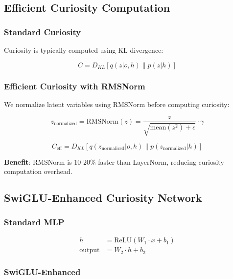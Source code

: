 \documentclass{IEEEtran}
\begin{document}
\subsection{Efficient Curiosity Computation}

\subsubsection{Standard Curiosity}

Curiosity is typically computed using KL divergence:

\begin{equation}
C = D_{KL}[q(z|o, h) \| p(z|h)]
\end{equation}

\subsubsection{Efficient Curiosity with RMSNorm}

We normalize latent variables using RMSNorm before computing curiosity:

\begin{equation}
z_{\text{normalized}} = \text{RMSNorm}(z) = \frac{z}{\sqrt{\text{mean}(z^2) + \epsilon}} \cdot \gamma
\end{equation}

\begin{equation}
C_{\text{eff}} = D_{KL}[q(z_{\text{normalized}}|o, h) \| p(z_{\text{normalized}}|h)]
\end{equation}

\textbf{Benefit}: RMSNorm is 10-20\% faster than LayerNorm, reducing curiosity computation overhead.

\subsection{SwiGLU-Enhanced Curiosity Network}

\subsubsection{Standard MLP}

\begin{align}
h &= \text{ReLU}(W_1 \cdot x + b_1) \\
\text{output} &= W_2 \cdot h + b_2
\end{align}

\subsubsection{SwiGLU-Enhanced}
\end{document}
